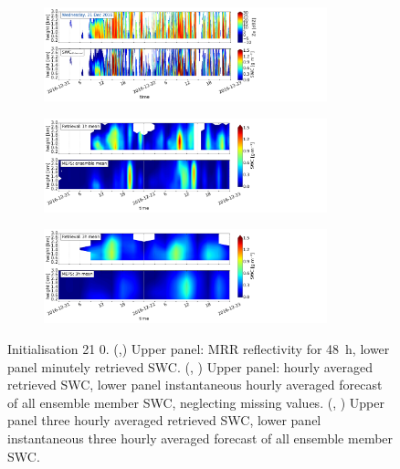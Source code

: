 \begin{figure}[H]
	\centering
	\begin{subfigure}[t]{\textwidth}
		\centering
		\includegraphics[trim={0.cm 2.2cm 19.cm 0.5cm},clip,width=0.9\textwidth]{./fig_obs_ret/20161221}
		\caption{}\label{fig:SWC:ret_21}
	\end{subfigure}
	\begin{subfigure}[t]{\textwidth}
		\centering
		\includegraphics[trim={0.cm 2.2cm 19.cm 0.5cm},clip,width=0.9\textwidth]{./fig_vert_SWC_EM/20161221}
		\caption{}\label{fig:SWC_EM:21}
	\end{subfigure}
	\begin{subfigure}[t]{\textwidth}
		\centering
		\includegraphics[trim={0.cm 0.8cm 19.cm 0.5cm},clip,width=0.9\textwidth]{./fig_vert_SWC_3h/20161221}
		\caption{}\label{fig:SWC3h:21}
	\end{subfigure}
	\caption{Initialisation \SI{21}{\dec} \SI{0}{\UTC}. 
		(\protect{},\protect{}) Upper panel: MRR reflectivity for \SI{48}{\hour}, lower panel minutely retrieved SWC. 
		(\protect{}, \protect{}) Upper panel: hourly averaged retrieved SWC, lower panel instantaneous hourly averaged forecast of all ensemble member SWC, neglecting missing values. 
		(\protect{}, \protect{}) Upper panel three hourly averaged retrieved SWC, lower panel instantaneous three hourly averaged forecast of all ensemble member SWC.   }\label{fig:ret:SWC21_24}
\end{figure}
